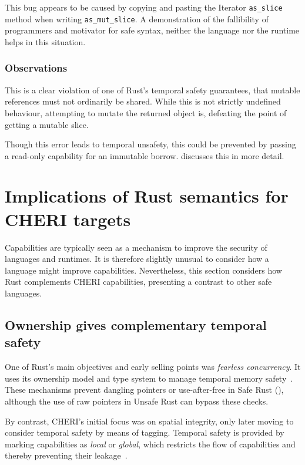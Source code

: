 \documentclass[dissertation.tex]{subfiles}
\begin{document}
This bug appears to be caused by copying and pasting the Iterator
\texttt{as\_slice} method when writing \texttt{as\_mut\_slice}.
A demonstration of the fallibility of programmers and motivator for safe
syntax, neither the language nor the runtime helps in this situation.

\subsubsection{Observations}
This is a clear violation of one of Rust's temporal safety guarantees,
that mutable references must not ordinarily be shared.
While this is not strictly undefined behaviour, attempting to mutate the
returned object is, defeating the point of getting a mutable slice.

Though this error leads to temporal unsafety, this could be prevented by
passing a read-only capability for an immutable borrow.
 discusses this in more detail.


\section{Implications of Rust semantics for CHERI targets}
\label{sec:eval-cheri}

Capabilities are typically seen as a mechanism to improve the security
of languages and runtimes.
It is therefore slightly unusual to consider how a language might
improve capabilities.
Nevertheless, this section considers how Rust complements CHERI
capabilities, presenting a contrast to other safe languages.

\subsection{Ownership gives complementary temporal safety}
\label{sec:eval-cheri-spatial-temporal}

One of Rust's main objectives and early selling points was
\emph{fearless concurrency}.
It uses its ownership model and type system to manage temporal memory
safety~\cite{rust-trpl-book}.
These mechanisms prevent dangling pointers or use-after-free in Safe
Rust (), although the use of raw pointers in
Unsafe Rust can bypass these checks.

By contrast, CHERI's initial focus was on spatial integrity, only later
moving to consider temporal safety by means of tagging.
Temporal safety is provided by marking capabilities as \emph{local} or
\emph{global}, which restricts the flow of capabilities and thereby
preventing their leakage~\cite{cheri2015}.
\end{document}
